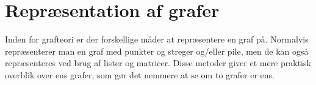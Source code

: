 \section{Repræsentation af grafer}
Inden for grafteori er der forskellige måder at repræsentere en graf på. Normalvis repræsenterer man en graf med punkter og streger og/eller pile, men de kan også repræsenteres ved brug af lister og matricer. Disse metoder giver et mere praktisk overblik over ens grafer, som gør det nemmere at se om to grafer er ens.
